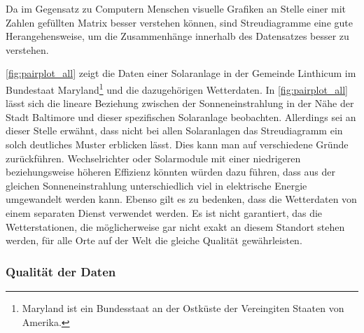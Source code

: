 \documentclass[12pt, a4paper]{article}
\begin{document}
Da im Gegensatz zu Computern Menschen visuelle Grafiken an Stelle einer mit Zahlen gefüllten Matrix besser verstehen können, sind Streudiagramme eine gute Herangehensweise, um die Zusammenhänge innerhalb des Datensatzes besser zu verstehen.

\autoref{fig:pairplot_all} zeigt die Daten einer Solaranlage in der Gemeinde Linthicum im Bundestaat Maryland\footnote{Maryland ist ein Bundesstaat an der Ostküste der Vereingiten Staaten von Amerika.} und die dazugehörigen Wetterdaten. In \autoref{fig:pairplot_all} lässt sich die lineare Beziehung zwischen der Sonneneinstrahlung in der Nähe der Stadt Baltimore und dieser spezifischen Solaranlage beobachten. Allerdings sei an dieser Stelle erwähnt, dass nicht bei allen Solaranlagen das Streudiagramm ein solch deutliches Muster erblicken lässt. Dies kann man auf verschiedene Gründe zurückführen. Wechselrichter oder Solarmodule mit einer niedrigeren beziehungsweise höheren Effizienz könnten würden dazu führen, dass aus der gleichen Sonneneinstrahlung unterschiedlich viel in elektrische Energie umgewandelt werden kann. Ebenso gilt es zu bedenken, dass die Wetterdaten von einem separaten Dienst verwendet werden. Es ist nicht garantiert, das die Wetterstationen, die möglicherweise gar nicht exakt an diesem Standort stehen werden, für alle Orte auf der Welt die gleiche Qualität gewährleisten.

\subsubsection{Qualität der Daten}
\label{subsubsec:quality_data}
\end{document}
